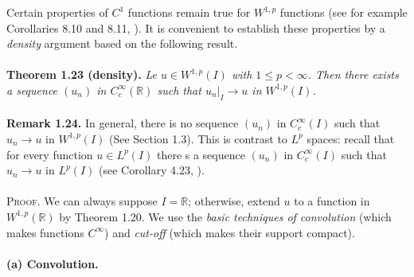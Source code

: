 \documentclass[a4paper,oneside]{article}
\numberwithin{equation}{section}
\begin{document}
Certain properties of $C^1$ functions remain true for $W^{1,p}$ functions (see for example Corollaries 8.10 and 8.11, \cite{1}). It is convenient to establish these properties by a \textit{density} argument based on the following result.\\
\\
\textbf{Theorem 1.23 (density).} \textit{Le $u\in W^{1,p}\left(I\right)$ with $1\le p<\infty$. Then there exists a sequence $\left(u_n\right)$ in $C_c^{\infty}\left(\mathbb{R}\right)$ such that ${\left. {{u_n}} \right|_I} \to u$ in $W^{1,p}\left(I\right)$.}\\
\\
\textbf{Remark 1.24.} In general, there is no sequence $\left(u_n\right)$ in $C_c^{\infty}\left(I\right)$ such that $u_n\to u$ in $W^{1,p}\left(I\right)$ (See Section 1.3). This is contrast to $L^p$ spaces: recall that for every function $u\in L^p\left(I\right)$ there s a sequence $\left(u_n\right)$ in $C_c^{\infty}\left(I\right)$ such that $u_n\to u$ in $L^p\left(I\right)$ (see Corollary 4.23, \cite{1}).\\
\\
\textsc{Proof.} We can always suppose $I=\mathbb{R}$; otherwise, extend $u$ to a function in $W^{1,p}\left(\mathbb{R}\right)$ by Theorem 1.20. We use the \textit{basic techniques of convolution} (which makes functions $C^{\infty}$) and \textit{cut-off} (which makes their support compact).\\
\\
\textbf{(a) Convolution.}
\end{document}
